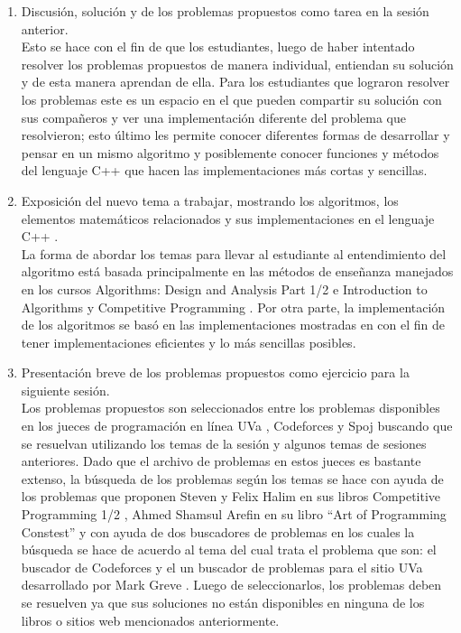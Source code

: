 \documentclass[conference]{IEEEtran}
\begin{document}
	\begin{enumerate}
		\item Discusión, solución y de los problemas propuestos como tarea en la sesión anterior.\\Esto se hace con el fin de que los estudiantes, luego de haber intentado resolver los problemas propuestos de manera individual, entiendan su solución y de esta manera aprendan de ella. Para los estudiantes que lograron resolver los problemas este es un espacio en el que pueden compartir su solución con sus compañeros y ver una implementación diferente del problema que resolvieron; esto último les permite conocer diferentes formas de desarrollar y pensar en un mismo algoritmo y posiblemente conocer funciones y métodos del lenguaje C++ que hacen las implementaciones más cortas y sencillas.
		\item Exposición del nuevo tema a trabajar, mostrando los algoritmos, los elementos matemáticos relacionados y sus implementaciones en el lenguaje C++ \cite{C++}.\\La forma de abordar los temas para llevar al estudiante al entendimiento del algoritmo está basada principalmente en las métodos de enseñanza manejados en los cursos Algorithms: Design and Analysis Part 1/2 \cite{Coursera1, Coursera2} e Introduction to Algorithms \cite{CourseMIT} y Competitive Programming \cite{CourseNUS}. Por otra parte, la implementación de los algoritmos se basó en las implementaciones mostradas en \cite{Halim, Halim2, ArtOfProgramming} con el fin de tener implementaciones eficientes y lo más sencillas posibles.
		\item Presentación breve de los problemas propuestos como ejercicio para la siguiente sesión.\\Los problemas propuestos son seleccionados entre los problemas disponibles en los jueces de programación en línea UVa \cite{UVa}, Codeforces \cite{Codeforces} y Spoj\cite{Spoj} buscando que se resuelvan utilizando los temas de la sesión y algunos temas de sesiones anteriores. Dado que el archivo de problemas en estos jueces es bastante extenso, la búsqueda de los problemas según los temas se hace con ayuda de los problemas que proponen Steven y Felix Halim en sus libros Competitive Programming 1/2 \cite{Halim, Halim2}, Ahmed Shamsul Arefin en su libro ``Art of Programming Constest''\cite{ArtOfProgramming} y con ayuda de dos buscadores de problemas en los cuales la búsqueda se hace de acuerdo al tema del cual trata el problema que son: el buscador de Codeforces y el un buscador de problemas para el sitio UVa desarrollado por Mark Greve \cite{UVAToolkit}. Luego de seleccionarlos, los problemas deben se resuelven ya que sus soluciones no están disponibles en ninguna de los libros o sitios web mencionados anteriormente.
	\end{enumerate}
\end{document}
